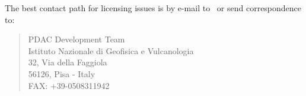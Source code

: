 The best contact path for licensing issues is by e-mail to \PDACADDRESS\ 
or send correspondence to:
\begin{verse}
                             PDAC Development Team\\
                             Istituto Nazionale di Geofisica e Vulcanologia\\
                             32, Via della Faggiola\\
			     56126, Pisa - Italy\\
                             FAX: +39-0508311942
\end{verse}



